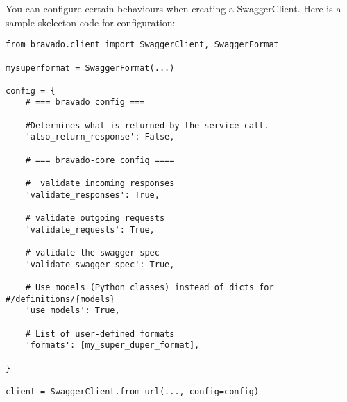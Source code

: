 You can configure certain behaviours when creating a SwaggerClient. Here
is a sample skelecton code for configuration:

\begin{lstlisting}
from bravado.client import SwaggerClient, SwaggerFormat

mysuperformat = SwaggerFormat(...)

config = {
    # === bravado config ===

    #Determines what is returned by the service call.
    'also_return_response': False,

    # === bravado-core config ====

    #  validate incoming responses
    'validate_responses': True,

    # validate outgoing requests
    'validate_requests': True,

    # validate the swagger spec
    'validate_swagger_spec': True,

    # Use models (Python classes) instead of dicts for #/definitions/{models}
    'use_models': True,

    # List of user-defined formats
    'formats': [my_super_duper_format],

}

client = SwaggerClient.from_url(..., config=config)
\end{lstlisting}

